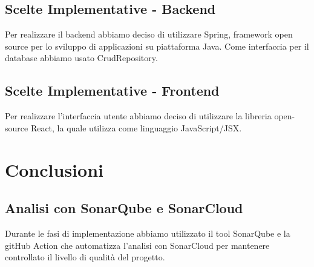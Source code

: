 \documentclass[a4paper,12pt]{report}
\begin{document}
      \section{Scelte Implementative - Backend}
Per realizzare il backend abbiamo deciso di utilizzare Spring, framework open source per lo sviluppo di applicazioni su piattaforma Java.
Come interfaccia per il database abbiamo usato CrudRepository.\\
   	\section{Scelte Implementative - Frontend}
Per realizzare l'interfaccia utente abbiamo deciso di utilizzare la libreria open-source React, la quale utilizza come linguaggio JavaScript/JSX.
							
      \chapter{Conclusioni}
    
     	\section{Analisi con SonarQube e SonarCloud}
Durante le fasi di implementazione abbiamo utilizzato il tool SonarQube e la gitHub Action che automatizza l'analisi con SonarCloud per mantenere controllato il livello di qualità del progetto.\\
\end{document}
